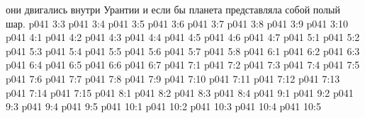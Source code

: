 они двигались внутри Урантии и если бы планета представляла собой полый шар.
\vs p041 3:3 \pc 
\vs p041 3:4 
\vs p041 3:5 \pc 
\vs p041 3:6 \pc 
\vs p041 3:7 
\vs p041 3:8 \pc 
\vs p041 3:9 
\vs p041 3:10 
\vs p041 4:1 
\vs p041 4:2 \pc 
\vs p041 4:3 \pc 
\vs p041 4:4 
\vs p041 4:5 
\vs p041 4:6 
\vs p041 4:7 
\vs p041 5:1 
\vs p041 5:2 
\vs p041 5:3 
\vs p041 5:4 
\vs p041 5:5 
\vs p041 5:6 \pc 
\vs p041 5:7 \pc 
\vs p041 5:8 
\vs p041 6:1 
\vs p041 6:2 
\vs p041 6:3 \pc 
\vs p041 6:4 
\vs p041 6:5 
\vs p041 6:6 \pc 
\vs p041 6:7 \pc 
{}
\vs p041 7:1 
\vs p041 7:2 
\vs p041 7:3 \pc 
\vs p041 7:4 
\vs p041 7:5 
\vs p041 7:6 
\vs p041 7:7 
\vs p041 7:8 
\vs p041 7:9 
\vs p041 7:10 
\vs p041 7:11 \pc 
\vs p041 7:12 \pc 
\vs p041 7:13 
\vs p041 7:14 \pc 
\vs p041 7:15 
\vs p041 8:1 
\vs p041 8:2 \pc 
\vs p041 8:3 \pc 
\vs p041 8:4 
\vs p041 9:1 
\vs p041 9:2 \pc 
\vs p041 9:3 \pc 
\vs p041 9:4 
\vs p041 9:5 
\vs p041 10:1 
\vs p041 10:2 
\vs p041 10:3 \pc 
\vs p041 10:4 
\vs p041 10:5 \pc 
